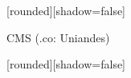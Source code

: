 \documentclass[%
xcolor=pdftex,dvipsnames,table%
]{beamer}
\begin{document}
{
[rounded][shadow=false]
\begin{frame}[plain]
  \begin{block}{}
    CMS (.co: Uniandes)
  \end{block}
\end{frame}
}
{
[rounded][shadow=false]
\begin{frame}[plain]
\end{frame}
}
\end{document}
